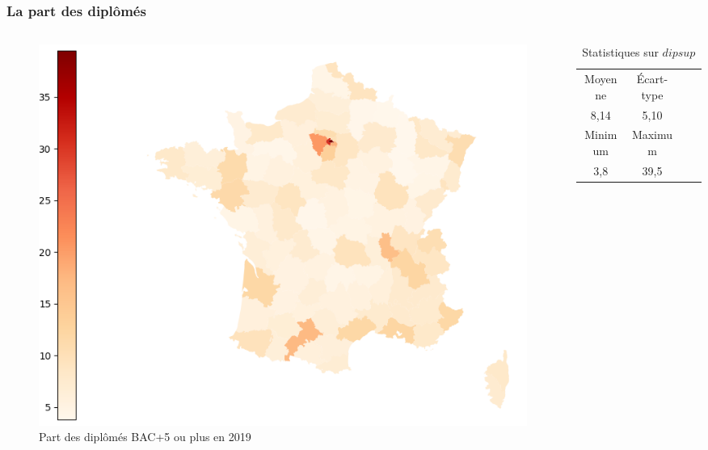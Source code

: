 \documentclass{beamer}
\begin{document}
\begin{frame}
\frametitle{La part des diplômés}
\begin{columns}
\begin{column}{0.5\textwidth}
    \centering
    \begin{figure}
        \includegraphics[width=\textwidth]{dipsup.png}
        \caption{Part des diplômés BAC+5 ou plus en 2019}
    \end{figure}
\end{column}

\begin{column}{0.5\textwidth}
\begin{table}[H]
    \caption*{Statistiques sur $dipsup$}
    \begin{tabular}{cccc}
    \toprule
    Moyenne  & Écart-type   \\ 
    8,14 & 5,10   \\
    \midrule
    Minimum & Maximum   \\ 
    3,8    & 39,5      \\
    \bottomrule
    \end{tabular}
\end{table}
\end{column}

\end{columns}
\end{frame}
\end{document}
